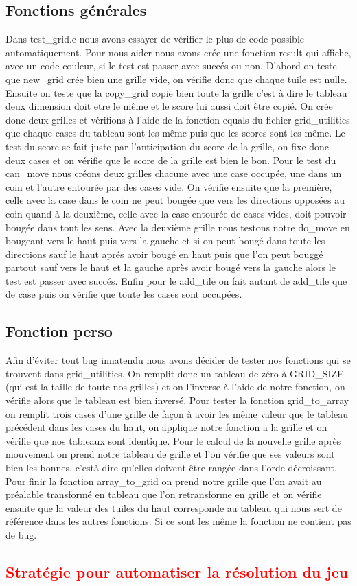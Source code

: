 \documentclass{article}
\begin{document}
  \subsection{Fonctions générales}
  Dans test\_grid.c nous avons essayer de vérifier le plus de code possible automatiquement.
  Pour nous aider nous avons crée une fonction result qui affiche, avec un code couleur, si le test est passer avec succés ou non.
  D'abord on teste que new\_grid crée bien une grille vide, on vérifie donc que chaque tuile est nulle.
  Ensuite on teste que la copy\_grid copie bien toute la grille c'est à dire le tableau deux dimension doit etre le même et le score lui aussi doit être copié. On crée donc deux grilles et vérifions à l'aide de la fonction equals du fichier grid\_utilities que chaque cases du tableau sont les même puis que les scores sont les même.
  Le test du score se fait juste par l'anticipation du score de la grille, on fixe donc deux cases et on vérifie que le score de la grille est bien le bon.
  Pour le test du can\_move nous créons deux grilles chacune avec une case occupée, une dans un coin et l'autre entourée par des cases vide. On vérifie ensuite que la première, celle avec la case dans le coin ne peut bougée que vers les directions opposées au coin quand à la deuxième, celle avec la case entourée de cases vides, doit pouvoir bougée dans tout les sens.
  Avec la deuxième grille nous testons notre do\_move en bougeant vers le haut puis vers la gauche et si on peut bougé dans toute les directions sauf le haut aprés avoir bougé en haut puis que l'on peut bouggé partout sauf vers le haut et la gauche après avoir bougé vers la gauche alors le test est passer avec succés.
  Enfin pour le add\_tile on fait autant de add\_tile que de case puis on vérifie que toute les cases sont occupées.
  \subsection{Fonction perso}
  Afin d'éviter tout bug innatendu nous avons décider de tester nos fonctions qui se trouvent dans grid\_utilities.
  On remplit donc un tableau de zéro à GRID\_SIZE (qui est la taille de toute nos grilles) et on l'inverse à l'aide de notre fonction, on vérifie alors que le tableau est bien inversé.
  Pour tester la fonction grid\_to\_array on remplit trois cases d'une grille de façon à avoir les même valeur que le tableau précédent dans les cases du haut, on applique notre fonction a la grille et on vérifie que nos tableaux sont identique.
  Pour le calcul de la nouvelle grille après mouvement on prend notre tableau de grille et l'on vérifie que ses valeurs sont bien les bonnes, c'està dire qu'elles doivent être rangée dans l'orde décroissant.
  Pour finir la fonction array\_to\_grid on prend notre grille que l'on avait au préalable transformé en tableau que l'on retransforme en grille et on vérifie ensuite que la valeur des tuiles du haut corresponde au tableau qui nous sert de référence dans les autres fonctions. Si ce sont les même la fonction ne contient pas de bug.
  
  \textcolor{red}{\section{Stratégie pour automatiser la résolution du jeu}}
\end{document}
